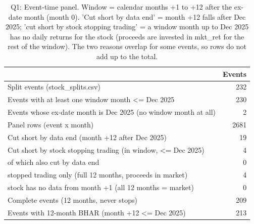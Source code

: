 \begin{table}
\caption{Q1: Event-time panel. Window = calendar months +1 to +12 after the ex-date month (month 0). 'Cut short by data end' = month +12 falls after Dec 2025; 'cut short by stock stopping trading' = a window month up to Dec 2025 has no daily returns for the stock (proceeds are invested in mkt\_ret for the rest of the window). The two reasons overlap for some events, so rows do not add up to the total.}
\label{tab:q1}
\begin{tabular}{p{11cm}r}
\toprule
 & Events \\
\midrule
Split events (stock\_splits.csv) & 232 \\
Events with at least one window month <= Dec 2025 & 230 \\
Events whose ex-date month is Dec 2025 (no window month at all) & 2 \\
Panel rows (event x month) & 2681 \\
Cut short by data end (month +12 after Dec 2025) & 19 \\
Cut short by stock stopping trading (in window, <= Dec 2025) & 4 \\
   of which also cut by data end & 0 \\
   stopped trading only (full 12 months, proceeds in market) & 4 \\
   stock has no data from month +1 (all 12 months = market) & 0 \\
Complete events (12 months, never stops) & 209 \\
Events with 12-month BHAR (month +12 <= Dec 2025) & 213 \\
\bottomrule
\end{tabular}
\end{table}
